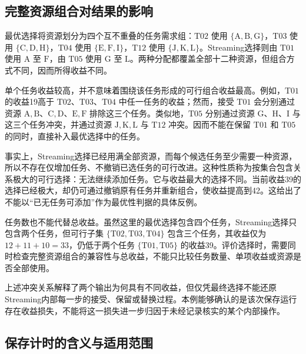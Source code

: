 \subsection{完整资源组合对结果的影响}

最优选择将资源划分为四个互不重叠的任务需求组：$\mathrm{T02}$ 使用 $\{\mathrm{A},\allowbreak\mathrm{B},\allowbreak\mathrm{G}\}$，$\mathrm{T03}$ 使用 $\{\mathrm{C},\allowbreak\mathrm{D},\allowbreak\mathrm{H}\}$，$\mathrm{T04}$ 使用 $\{\mathrm{E},\allowbreak\mathrm{F},\allowbreak\mathrm{I}\}$，$\mathrm{T12}$ 使用 $\{\mathrm{J},\allowbreak\mathrm{K},\allowbreak\mathrm{L}\}$。Streaming选择则由 $\mathrm{T01}$ 使用 $\mathrm{A}$ 至 $\mathrm{F}$，由 $\mathrm{T05}$ 使用 $\mathrm{G}$ 至 $\mathrm{L}$。两种分配都覆盖全部十二种资源，但组合方式不同，因而所得收益不同。

单个任务收益较高，并不意味着围绕该任务形成的可行组合收益最高。例如，$\mathrm{T01}$ 的收益19高于 $\mathrm{T02}$、$\mathrm{T03}$、$\mathrm{T04}$ 中任一任务的收益；然而，接受 $\mathrm{T01}$ 会分别通过资源 $\mathrm{A},\mathrm{B}$、$\mathrm{C},\mathrm{D}$、$\mathrm{E},\mathrm{F}$ 排除这三个任务。类似地，$\mathrm{T05}$ 分别通过资源 $\mathrm{G}$、$\mathrm{H}$、$\mathrm{I}$ 与这三个任务冲突，并通过资源 $\mathrm{J},\allowbreak\mathrm{K},\allowbreak\mathrm{L}$ 与 $\mathrm{T12}$ 冲突。因而不能在保留 $\mathrm{T01}$ 和 $\mathrm{T05}$ 的同时，直接补入最优选择中的任务。

事实上，Streaming选择已经用满全部资源，而每个候选任务至少需要一种资源，所以不存在仅增加任务、不撤销已选任务的可行改进。这种性质称为按集合包含关系极大的可行选择：无法继续添加任务。它与收益最大的选择不同。当前收益39的选择已经极大，却仍可通过撤销原有任务并重新组合，使收益提高到42。这给出了不能以“已无任务可添加”作为最优性判据的具体反例。

任务数也不能代替总收益。虽然这里的最优选择包含四个任务，Streaming选择只包含两个任务，但可行子集 $\{\mathrm{T02},\allowbreak\mathrm{T03},\allowbreak\mathrm{T04}\}$ 包含三个任务，其收益仅为 $12+11+10=33$，仍低于两个任务 $\{\mathrm{T01},\allowbreak\mathrm{T05}\}$ 的收益39。评价选择时，需要同时检查完整资源组合的兼容性与总收益，不能只比较任务数量、单项收益或资源是否全部使用。

上述冲突关系解释了两个输出为何具有不同收益，但仅凭最终选择不能还原Streaming内部每一步的接受、保留或替换过程。本例能够确认的是该次保存运行存在收益损失，不能将这一损失进一步归因于未经记录核实的某个内部操作。

\subsection{保存计时的含义与适用范围}

